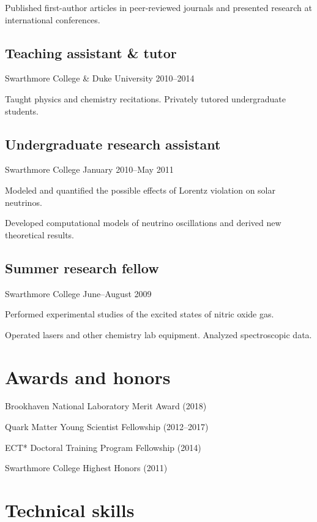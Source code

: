 \documentclass[letterpaper,10pt]{article}
\begin{document}
\begin{multicols}{2}
Published first-author articles in peer-reviewed journals and presented research at international conferences.

\subsection{Teaching assistant \& tutor}
\vspace{-\parskip}
{\small Swarthmore College \& Duke University \hfill 2010--2014}

Taught physics and chemistry recitations.
Privately tutored undergraduate students.

\subsection{Undergraduate research assistant}
\vspace{-\parskip}
{\small Swarthmore College \hfill January 2010--May 2011}

Modeled and quantified the possible effects of Lorentz violation on solar neutrinos.

Developed computational models of neutrino oscillations and derived new theoretical results.

\subsection{Summer research fellow}
\vspace{-\parskip}
{\small Swarthmore College \hfill June--August 2009}

Performed experimental studies of the excited states of nitric oxide gas.

Operated lasers and other chemistry lab equipment.
Analyzed spectroscopic data.


\section{Awards and honors}

Brookhaven National Laboratory Merit Award (2018)

Quark Matter Young Scientist Fellowship (2012--2017)

ECT* Doctoral Training Program Fellowship (2014)

Swarthmore College Highest Honors (2011)


\columnbreak


\section{Technical skills}


\end{multicols}
\end{document}
